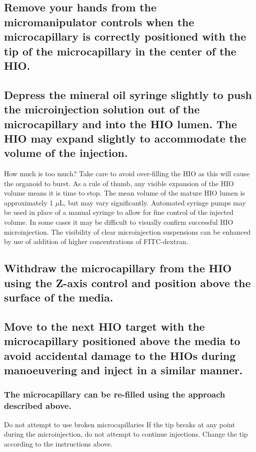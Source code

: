 \documentclass[11pt]{article}
\begin{document}
\subsection{{\sffamily } Remove your hands from the micromanipulator controls when the microcapillary is correctly positioned with the tip of the microcapillary in the center of the HIO.}
\label{sec:orgheadline50}
\subsection{{\sffamily } Depress the mineral oil syringe slightly to push the microinjection solution out of the microcapillary and into the HIO lumen. The HIO may expand slightly to accommodate the volume of the injection.}
\label{sec:orgheadline51}
\begin{bclogo}[logo=\bcinfo, couleurBarre=Black, noborder=true, couleur=gray!10]{     How much is too much?}
Take care to avoid over-filling the HIO as this will cause the organoid to burst. As a rule of thumb, any visible expansion of the HIO volume means it is time to stop. The mean volume of the mature HIO lumen is approximately 1 \(\mu\)L, but may vary significantly. Automated syringe pumps may be used in place of a manual syringe to allow for fine control of the injected volume. In some cases it may be difficult to visually confirm successful HIO microinjection. The visibility of clear microinjection suspensions can be enhanced by use of addition of higher concentrations of FITC-dextran.\\
\end{bclogo}
\subsection{{\sffamily } Withdraw the microcapillary from the HIO using the Z-axis control and position above the surface of the media.}
\label{sec:orgheadline52}
\subsection{{\sffamily } Move to the next HIO target with the microcapillary positioned above the media to avoid accidental damage to the HIOs during manoeuvering and inject in a similar manner.}
\label{sec:orgheadline54}
\subsubsection{{\sffamily } The microcapillary can be re-filled using the approach described above.}
\label{sec:orgheadline53}
\begin{bclogo}[logo=\bcinfo, couleurBarre=Black, noborder=true, couleur=gray!10]{     Do not attempt to  use broken microcapillaries}
If the tip breaks at any point during the microinjection, do not attempt to continue injections. Change the tip according to the instructions above.\\
\end{bclogo}
\end{document}
